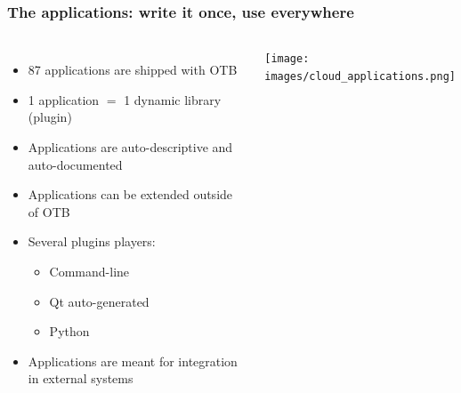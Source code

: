 \documentclass[8pt]{beamer}
\begin{document}
\begin{frame}
\frametitle{The applications: write it once, use everywhere}
\begin{columns}
\begin{itemize}
\item 87 applications are shipped with OTB
\item 1 application $=$ 1 dynamic library (plugin)
\item Applications are auto-descriptive and auto-documented
\item Applications can be extended outside of OTB
\item Several plugins players:
\begin{itemize}
  \item Command-line
  \item Qt auto-generated
  \item Python
\end{itemize}
\item Applications are meant for integration in external systems
\end{itemize}
\texttt{[image: images/cloud\_applications.png]}
\end{columns}
\end{frame}
\end{document}

